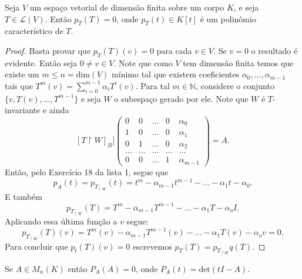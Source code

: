 \documentclass[11pt,twoside,a4paper]{book}
\begin{document}
  \begin{teorema}
   Seja \(V\) um espaço vetorial de dimensão finita sobre um corpo \(K\), e seja \(T\in\mathcal{L}(V)\). Então \(p_T(T)=0\), onde \(p_T(t)\in K[t]\) é um polinômio característico de \(T\). 
  \end{teorema}
   \begin{proof}
     Basta provar que \(p_T(T)(v)=0\) para cada \(v\in V\). Se \(v=0\) o resultado é evidente.
     Então seja \(0\not=v\in V\).
     Note que como \(V\) tem dimensão finita temos que existe um \(m \leq n = \text{dim}(V)\) mínimo tal que existem coeficientes \(\alpha_0,\ldots,\alpha_{m-1}\) tais que \(T^m(v)=\sum_{i=0}^{m-1}\alpha_iT^i(v)\). Para tal \(m\in\mathbb{N}\), considere o conjunto
     \(\{v,T(v),\ldots, T^{m-1}\}\) e seja \(W\) o subespaço gerado por ele. Note que \(W\) é \(T\)-invariante e ainda
     \[[T\upharpoonright W]_B]\begin{pmatrix}
         0 & 0 & \ldots& 0 &\alpha_0
         \\ 1 & 0 & \ldots & 0 & \alpha_1
         \\ 0 & 1 & \ldots & 0 & \alpha_2
         \\ \ldots & \ldots  & \ldots  & \ldots  & \ldots \
         \\ 0 & 0 & \ldots & 1 & \alpha_{m-1} 
       \end{pmatrix}=A.\]
     Então, pelo Exercício 18 da lista 1, segue que \[p_A(t)=p_{T_{\upharpoonright W}}(t)= t^m -\alpha_{m-1}t^{m-1}- \ldots -\alpha_1t-\alpha_0.\]
     E também
     \[p_{T_{\upharpoonright W}}(T)=T^m-\alpha_{m-1}T^{m-1}-\ldots-\alpha_1 T-\alpha_o I.\]
     Aplicando essa última função a \(v\) segue:
     \[p_{T_{\upharpoonright W}}(T)(v)=T^m(v)-\alpha_{m-1}T^{m-1}(v)-\ldots-\alpha_1 T(v)-\alpha_o v=0.\]
     Para concluir que \(p_t(T)(v)=0\) escrevemos \(p_T(T)=p_{T_{\upharpoonright W}}q(T).\)
     \end{proof}
     \begin{corolario}
 Se \(A\in M_n(K)\) então \(P_A(A)=0\), onde \(P_A(t)=\text{det}(tI -A)\). 
\end{corolario}
\end{document}
